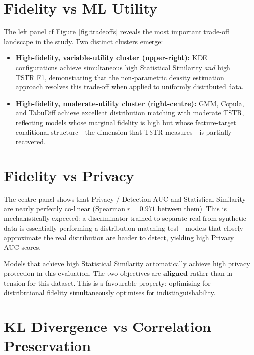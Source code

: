 \documentclass[11pt, a4paper]{report}
\begin{document}
\section{Fidelity vs ML Utility}

The left panel of Figure~\ref{fig:tradeoffs} reveals the most important trade-off landscape in the study. Two distinct clusters emerge:

\begin{itemize}[nosep,itemsep=4pt]
\item \textbf{High-fidelity, variable-utility cluster (upper-right):} KDE configurations achieve simultaneous high Statistical Similarity \emph{and} high TSTR F1, demonstrating that the non-parametric density estimation approach resolves this trade-off when applied to uniformly distributed data.
\item \textbf{High-fidelity, moderate-utility cluster (right-centre):} GMM, Copula, and TabuDiff achieve excellent distribution matching with moderate TSTR, reflecting models whose marginal fidelity is high but whose feature-target conditional structure---the dimension that TSTR measures---is partially recovered.
\end{itemize}

\section{Fidelity vs Privacy}

The centre panel shows that Privacy / Detection AUC and Statistical Similarity are nearly perfectly co-linear (Spearman $r = 0.971$ between them). This is mechanistically expected: a discriminator trained to separate real from synthetic data is essentially performing a distribution matching test---models that closely approximate the real distribution are harder to detect, yielding high Privacy AUC scores.

\begin{insightbox}
Models that achieve high Statistical Similarity automatically achieve high privacy protection in this evaluation. The two objectives are \textbf{aligned} rather than in tension for this dataset. This is a favourable property: optimising for distributional fidelity simultaneously optimises for indistinguishability.
\end{insightbox}

\section{KL Divergence vs Correlation Preservation}
\end{document}
